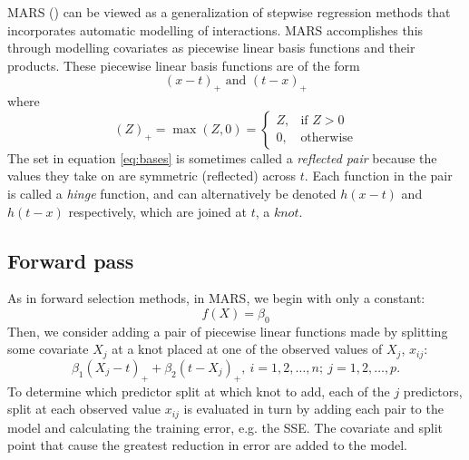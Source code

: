 \documentclass[12pt]{article}
\begin{document}
MARS (\cite{mars}) can be viewed as a generalization of stepwise regression methods that incorporates automatic modelling of interactions. MARS accomplishes this through modelling covariates as piecewise linear basis functions and their products. These piecewise linear basis functions are of the form
%
\begin{equation} \label{eq:bases}
  (x - t)_{+} \text{ and } (t - x)_{+}
\end{equation} where
%
\begin{equation}
  (Z)_{+} = \max(Z, 0) = \begin{cases}
  Z, & \text{if } Z > 0 \\
  0, & \text{otherwise}
  \end{cases}
\end{equation}
The set in equation \ref{eq:bases} is sometimes called a \emph{reflected pair} because the values they take on are symmetric (reflected) across $t$. Each function in the pair is called a \emph{hinge} function, and can alternatively be denoted $h(x - t)$ and $h(t - x)$ respectively, which are joined at $t$, a $knot$.

\subsection{Forward pass} %
\label{sub:forward_pass}

As in forward selection methods, in MARS,  we begin with only a constant:
\begin{equation}
  f(X) = \beta_{0}
\end{equation}
Then, we consider adding a pair of piecewise linear functions made by splitting some covariate $X_{j}$ at a knot placed at one of the observed values of $X_{j}$, $x_{ij}$:
\begin{equation}
\beta_{1} (X_{j} - t)_{+} + \beta_{2}(t - X_{j})_{+}, \ i = 1, 2, \ldots, n; \ j = 1, 2, \ldots, p.
\end{equation}
To determine which predictor split at which knot to add, each of the $j$ predictors, split at each observed value $x_{ij}$ is evaluated in turn by adding each pair to the model and calculating the training error, e.g. the SSE. The covariate and split point that cause the greatest reduction in error are added to the model.
\end{document}
